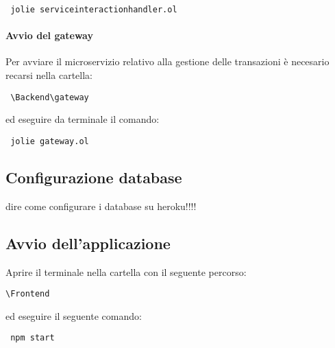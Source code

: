 	\begin{center}
		\verb| jolie serviceinteractionhandler.ol |
	\end{center}


\paragraph{Avvio del gateway}
	Per avviare il microservizio relativo alla gestione delle transazioni è necesario recarsi nella cartella:
	\begin{center}
		\verb| \Backend\gateway|
	\end{center}
	
	ed eseguire da terminale il comando:
	
	\begin{center}
		\verb| jolie gateway.ol |
	\end{center}


\subsection{Configurazione database}

dire come configurare i database su heroku!!!!

\subsection{Avvio dell'applicazione}
Aprire il terminale nella cartella con il seguente percorso:
\begin{center}
	\verb|\Frontend| 
\end{center} 
ed eseguire il seguente comando:
\begin{center}
	\verb| npm start|
\end{center}

